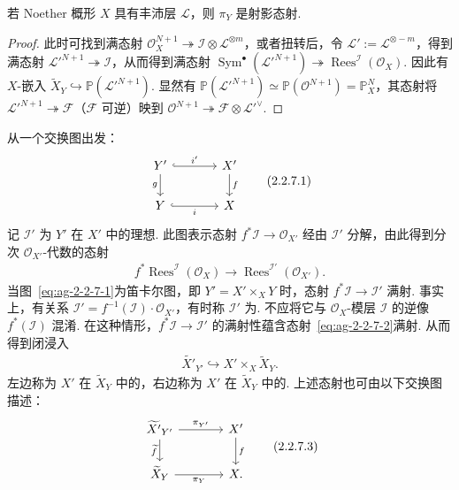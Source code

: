\begin{proposition}\label{item:ag-2-2-6}
若 Noether 概形 $X$ 具有丰沛层 $\mathcal L$，则 $\pi_Y$ 是射影态射.
\end{proposition}
\begin{proof}
此时可找到满态射 $\mathcal O_X^{N+1}\twoheadrightarrow\mathcal I\otimes\mathcal L^{\otimes m}$，或者扭转后，令 $\mathcal L':=\mathcal L^{\otimes-m}$，得到满态射 $\mathcal L'^{N+1}\twoheadrightarrow\mathcal I$，从而得到满态射 $\operatorname{Sym}^{\bullet}(\mathcal L'^{N+1})\twoheadrightarrow\operatorname{Rees}^{\mathcal I}(\mathcal O_X)$. 因此有 $X$-嵌入 $\widetilde X_Y\hookrightarrow\mathbb P(\mathcal L'^{N+1})$. 显然有 $\mathbb P(\mathcal L'^{N+1})\simeq\mathbb P(\mathcal O^{N+1})=\mathbb P_X^N$，其态射将 $\mathcal L'^{N+1}\twoheadrightarrow\mathcal F$（$\mathcal F$ 可逆）映到 $\mathcal O^{N+1}\twoheadrightarrow\mathcal F\otimes\mathcal L'^\vee$.
\end{proof}
\begin{numpara}[爆破的函子性]\label{item:ag-2-2-7}
从一个交换图出发：
\begin{align}
\begin{tikzcd}[ampersand replacement=\&,column sep=large]
Y'\arrow[r,hook,"i'"]\arrow[d,"g"']\&X'\arrow[d,"f"]\\
Y\arrow[r,hook,"i"']\&X
\end{tikzcd}\tag{2.2.7.1}\label{eq:ag-2-2-7-1}
\end{align}
记 $\mathcal I'$ 为 $Y'$ 在 $X'$ 中的理想. 此图表示态射 $f^*\mathcal I\longrightarrow\mathcal O_{X'}$ 经由 $\mathcal I'$ 分解，由此得到分次 $\mathcal O_{X'}$-代数的态射
\begin{align}
f^*\operatorname{Rees}^{\mathcal I}(\mathcal O_X)\longrightarrow\operatorname{Rees}^{\mathcal I'}(\mathcal O_{X'}).\tag{2.2.7.2}\label{eq:ag-2-2-7-2}
\end{align}
当图~\eqref{eq:ag-2-2-7-1}为笛卡尔图，即 $Y'=X'\times_XY$ 时，态射 $f^*\mathcal I\longrightarrow\mathcal I'$ 满射. 事实上，有关系 $\mathcal I'=f^{-1}(\mathcal I)\cdot\mathcal O_{X'}$，有时称 $\mathcal I'$ 为. 不应将它与 $\mathcal O_X$-模层 $\mathcal I$ 的逆像 $f^*(\mathcal I)$ 混淆. 在这种情形，$f^*\mathcal I\longrightarrow\mathcal I'$ 的满射性蕴含态射~\eqref{eq:ag-2-2-7-2}满射. 从而得到闭浸入
\begin{align*}
\widetilde{X'}_{Y'}\hookrightarrow X'\times_X\widetilde X_Y.
\end{align*}
左边称为 $X'$ 在 $\widetilde X_Y$ 中的，右边称为 $X'$ 在 $\widetilde X_Y$ 中的. 上述态射也可由以下交换图描述：
\begin{align}
\begin{tikzcd}[ampersand replacement=\&,column sep=large]
\widetilde{X'}_{Y'}\arrow[r,"\pi_{Y'}"]\arrow[d,"\widetilde f"']\&X'\arrow[d,"f"]\\
\widetilde X_Y\arrow[r,"\pi_Y"']\&X.
\end{tikzcd}\tag{2.2.7.3}\label{eq:ag-2-2-7-3}
\end{align}
\end{numpara}
